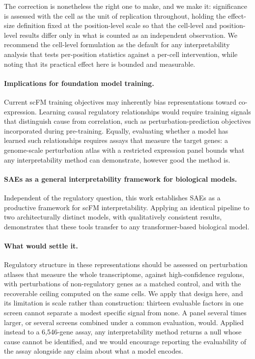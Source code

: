 The correction is nonetheless the right one to make, and we make it: significance is assessed with
the cell as the unit of replication throughout, holding the effect-size definition fixed at the
position-level scale so that the cell-level and position-level results differ only in what is
counted as an independent observation. We recommend the cell-level formulation as the default for
any interpretability analysis that tests per-position statistics against a per-cell intervention,
while noting that its practical effect here is bounded and measurable.

\paragraph{Implications for foundation model training.}
Current scFM training objectives may inherently bias representations toward co-expression. Learning
causal regulatory relationships would require training signals that distinguish cause from
correlation, such as perturbation-prediction objectives incorporated during pre-training. Equally,
evaluating whether a model has learned such relationships requires assays that measure the target
genes: a genome-scale perturbation atlas with a restricted expression panel bounds what any
interpretability method can demonstrate, however good the method is.

\paragraph{SAEs as a general interpretability framework for biological models.}
Independent of the regulatory question, this work establishes SAEs as a productive framework for
scFM interpretability. Applying an identical pipeline to two architecturally distinct models, with
qualitatively consistent results, demonstrates that these tools transfer to any transformer-based
biological model.

\paragraph{What would settle it.}
Regulatory structure in these representations should be assessed on perturbation atlases that
measure the whole transcriptome, against high-confidence regulons, with perturbations of
non-regulatory genes as a matched control, and with the recoverable ceiling computed on the same
cells. We apply that design here, and its limitation is scale rather than construction: thirteen
evaluable factors in one screen cannot separate a modest specific signal from none. A panel several
times larger, or several screens combined under a common evaluation, would. Applied instead to a
6,546-gene assay, any interpretability method returns a null whose cause cannot be identified, and
we would encourage reporting the evaluability of the assay alongside any claim about what a model
encodes.

